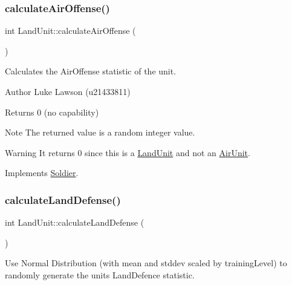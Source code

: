 \subsubsection{\texorpdfstring{calculateAirOffense()}{calculateAirOffense()}}
{\footnotesize\ttfamily int Land\+Unit\+::calculate\+Air\+Offense (\begin{DoxyParamCaption}{ }\end{DoxyParamCaption})\hspace{0.3cm}{\ttfamily [virtual]}}



Calculates the Air\+Offense statistic of the unit. 

\begin{DoxyAuthor}{Author}
Luke Lawson (u21433811) 
\end{DoxyAuthor}
\begin{DoxyReturn}{Returns}
0 (no capability) 
\end{DoxyReturn}
\begin{DoxyNote}{Note}
The returned value is a random integer value. 
\end{DoxyNote}
\begin{DoxyWarning}{Warning}
It returns 0 since this is a \mbox{\hyperlink{class_land_unit}{Land\+Unit}} and not an \mbox{\hyperlink{class_air_unit}{Air\+Unit}}. 
\end{DoxyWarning}


Implements \mbox{\hyperlink{class_soldier_ad5290f69e84772e9a3bfc060b5d348a0}{Soldier}}.

\mbox{\label{class_land_unit_acffd7525b2d214be433fe77ecf5610df}} 
\subsubsection{\texorpdfstring{calculateLandDefense()}{calculateLandDefense()}}
{\footnotesize\ttfamily int Land\+Unit\+::calculate\+Land\+Defense (\begin{DoxyParamCaption}{ }\end{DoxyParamCaption})\hspace{0.3cm}{\ttfamily [virtual]}}



Use Normal Distribution (with mean and stddev scaled by training\+Level) to randomly generate the unit\textquotesingle{}s Land\+Defence statistic. 

